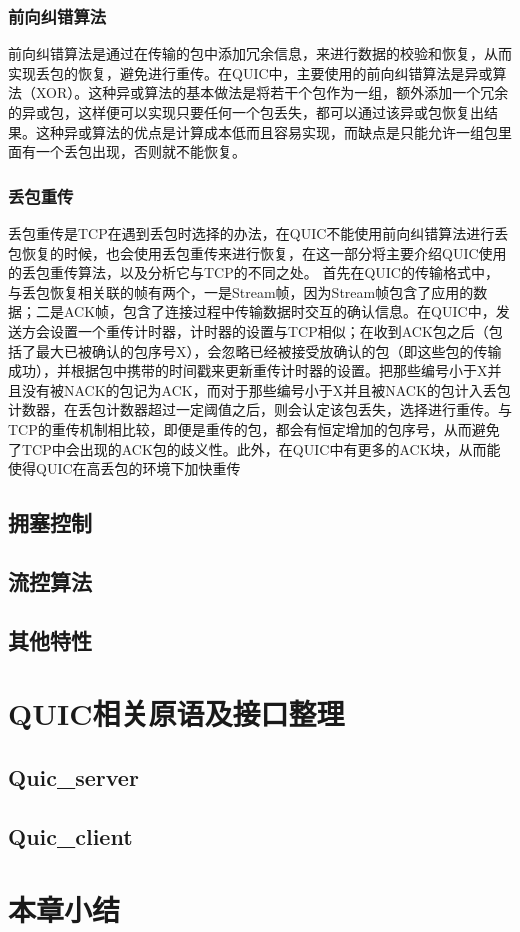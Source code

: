 \subsubsection{前向纠错算法}
前向纠错算法是通过在传输的包中添加冗余信息，来进行数据的校验和恢复，从而实现丢包的恢复，避免进行重传。在QUIC中，主要使用的前向纠错算法是异或算法（XOR）。这种异或算法的基本做法是将若干个包作为一组，额外添加一个冗余的异或包，这样便可以实现只要任何一个包丢失，都可以通过该异或包恢复出结果。这种异或算法的优点是计算成本低而且容易实现，而缺点是只能允许一组包里面有一个丢包出现，否则就不能恢复。
\subsubsection{丢包重传}
丢包重传是TCP在遇到丢包时选择的办法，在QUIC不能使用前向纠错算法进行丢包恢复的时候，也会使用丢包重传来进行恢复，在这一部分将主要介绍QUIC使用的丢包重传算法，以及分析它与TCP的不同之处。
首先在QUIC的传输格式中，与丢包恢复相关联的帧有两个，一是Stream帧，因为Stream帧包含了应用的数据；二是ACK帧，包含了连接过程中传输数据时交互的确认信息。在QUIC中，发送方会设置一个重传计时器，计时器的设置与TCP相似；在收到ACK包之后（包括了最大已被确认的包序号X），会忽略已经被接受放确认的包（即这些包的传输成功），并根据包中携带的时间戳来更新重传计时器的设置。把那些编号小于X并且没有被NACK的包记为ACK，而对于那些编号小于X并且被NACK的包计入丢包计数器，在丢包计数器超过一定阈值之后，则会认定该包丢失，选择进行重传。与TCP的重传机制相比较，即便是重传的包，都会有恒定增加的包序号，从而避免了TCP中会出现的ACK包的歧义性。此外，在QUIC中有更多的ACK块，从而能使得QUIC在高丢包的环境下加快重传
\subsection{拥塞控制}
\subsection{流控算法}
\subsection{其他特性}
\section{QUIC相关原语及接口整理}
\subsection{Quic\_server}
\subsection{Quic\_client}
\section{本章小结}
